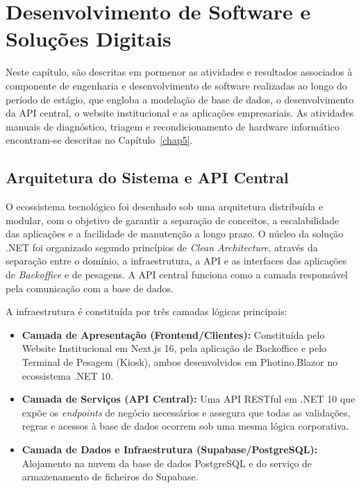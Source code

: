 \chapter{Desenvolvimento de Software e Soluções Digitais}\label{chap4}
\thispagestyle{fancy}

Neste capítulo, são descritas em pormenor as atividades e resultados associados à componente de engenharia e desenvolvimento de software realizadas ao longo do período de estágio, que engloba a modelação de base de dados, o desenvolvimento da API central, o website institucional e as aplicações empresariais. As atividades manuais de diagnóstico, triagem e recondicionamento de hardware informático encontram-se descritas no Capítulo~\ref{chap5}.

\section{Arquitetura do Sistema e API Central}\label{sec:arquitetura}

O ecossistema tecnológico foi desenhado sob uma arquitetura distribuída e modular, com o objetivo de garantir a separação de conceitos, a escalabilidade das aplicações e a facilidade de manutenção a longo prazo. O núcleo da solução .NET foi organizado segundo princípios de \textit{Clean Architecture}, através da separação entre o domínio, a infraestrutura, a \ac{API} e as interfaces das aplicações de \textit{Backoffice} e de pesagens. A \ac{API} central funciona como a camada responsável pela comunicação com a base de dados.

A infraestrutura é constituída por três camadas lógicas principais:
\begin{itemize}
    \item \textbf{Camada de Apresentação (Frontend/Clientes):} Constituída pelo Website Institucional em Next.js 16, pela aplicação de Backoffice e pelo Terminal de Pesagem (Kiosk), ambos desenvolvidos em Photino.Blazor no ecossistema .NET 10.
    \item \textbf{Camada de Serviços (API Central):} Uma API RESTful em .NET 10 que expõe os \textit{endpoints} de negócio necessários e assegura que todas as validações, regras e acessos à base de dados ocorrem sob uma mesma lógica corporativa.
    \item \textbf{Camada de Dados e Infraestrutura (Supabase/PostgreSQL):} Alojamento na nuvem da base de dados PostgreSQL e do serviço de armazenamento de ficheiros do Supabase.
\end{itemize}

